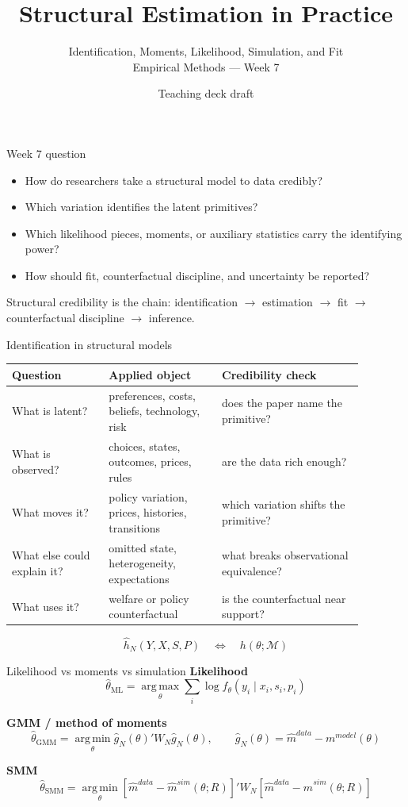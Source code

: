 \documentclass[aspectratio=169,11pt]{beamer}
\title{Structural Estimation in Practice}
\subtitle{Identification, Moments, Likelihood, Simulation, and Fit \\ Empirical Methods --- Week 7}
\author{Teaching deck draft}
\date{}
\newcommand{\1}{\mathbf{1}}
\newcommand{\argmax}{\operatorname*{arg\,max}}
\newcommand{\argmin}{\operatorname*{arg\,min}}
\begin{document}
\begin{frame}
  \titlepage
\end{frame}

\begin{frame}{Week 7 question}
\begin{itemize}
    \item How do researchers take a structural model to data credibly?
    \item Which variation identifies the latent primitives?
    \item Which likelihood pieces, moments, or auxiliary statistics carry the identifying power?
    \item How should fit, counterfactual discipline, and uncertainty be reported?
\end{itemize}

\medskip
Structural credibility is the chain: identification $\rightarrow$ estimation $\rightarrow$ fit $\rightarrow$ counterfactual discipline $\rightarrow$ inference.
\end{frame}

\begin{frame}{Identification in structural models}
\small
\begin{tabular}{p{0.24\linewidth} p{0.29\linewidth} p{0.35\linewidth}}
\toprule
Question & Applied object & Credibility check \\
\midrule
What is latent? & preferences, costs, beliefs, technology, risk & does the paper name the primitive? \\
What is observed? & choices, states, outcomes, prices, rules & are the data rich enough? \\
What moves it? & policy variation, prices, histories, transitions & which variation shifts the primitive? \\
What else could explain it? & omitted state, heterogeneity, expectations & what breaks observational equivalence? \\
What uses it? & welfare or policy counterfactual & is the counterfactual near support? \\
\bottomrule
\end{tabular}

\[
\widehat h_N(Y,X,S,P)
\quad \Longleftrightarrow \quad
h(\theta;\mathcal M)
\]
\end{frame}

\begin{frame}{Likelihood vs moments vs simulation}
\small
\textbf{Likelihood}
\[
\widehat\theta_{\mathrm{ML}}
=
\argmax_\theta
\sum_i \log f_\theta(y_i\mid x_i,s_i,p_i)
\]

\textbf{GMM / method of moments}
\[
\widehat\theta_{\mathrm{GMM}}
=
\argmin_\theta
\widehat g_N(\theta)'W_N\widehat g_N(\theta),
\qquad
\widehat g_N(\theta)=\widehat m^{data}-m^{model}(\theta)
\]

\textbf{SMM}
\[
\widehat\theta_{\mathrm{SMM}}
=
\argmin_\theta
\left[\widehat m^{data}-\widehat m^{sim}(\theta;R)\right]'
W_N
\left[\widehat m^{data}-\widehat m^{sim}(\theta;R)\right]
\]
\end{frame}
\end{document}
